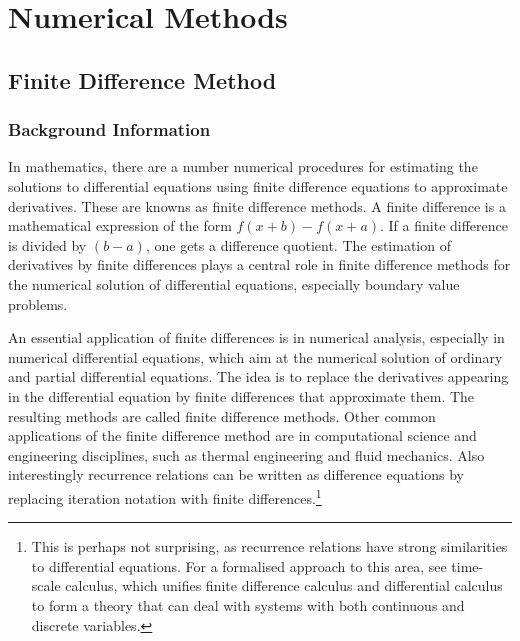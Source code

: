 \documentclass[aps,twocolumn,pre,nofootinbib,10pt]{revtex4-1}
\begin{document}


\section{Numerical Methods \label{sec:met}}

 
\subsection{Finite Difference Method}

\subsubsection{Background Information}

\par\hspace{4mm} In mathematics, there are a number numerical procedures for estimating the solutions to differential equations using finite difference equations to approximate derivatives. These are knowns as finite difference methods. A finite difference is a mathematical expression of the form \(f(x + b) - f(x + a)\). If a finite difference is divided by \((b - a)\), one gets a difference quotient. The estimation of derivatives by finite differences plays a central role in finite difference methods for the numerical solution of differential equations, especially boundary value problems.
\vspace{5mm} \par \indent An essential application of finite differences is in numerical analysis, especially in numerical differential equations, which aim at the numerical solution of ordinary and partial differential equations. The idea is to replace the derivatives appearing in the differential equation by finite differences that approximate them. The resulting methods are called finite difference methods. Other common applications of the finite difference method are in computational science and engineering disciplines, such as thermal engineering and fluid mechanics. Also interestingly recurrence relations can be written as difference equations by replacing iteration notation with finite differences.\footnote{This is perhaps not surprising, as recurrence relations have strong similarities to differential equations. For a formalised approach to this area, see time-scale calculus, which unifies finite difference calculus and differential calculus to form a theory that can deal with systems with both continuous and discrete variables.}
\end{document}
